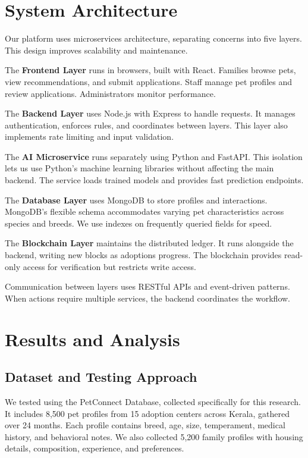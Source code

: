 \documentclass[conference]{IEEEtran}
\begin{document}
\section{System Architecture}

Our platform uses microservices architecture, separating concerns into five layers. This design improves scalability and maintenance.

The \textbf{Frontend Layer} runs in browsers, built with React. Families browse pets, view recommendations, and submit applications. Staff manage pet profiles and review applications. Administrators monitor performance.

The \textbf{Backend Layer} uses Node.js with Express to handle requests. It manages authentication, enforces rules, and coordinates between layers. This layer also implements rate limiting and input validation.

The \textbf{AI Microservice} runs separately using Python and FastAPI. This isolation lets us use Python's machine learning libraries without affecting the main backend. The service loads trained models and provides fast prediction endpoints.

The \textbf{Database Layer} uses MongoDB to store profiles and interactions. MongoDB's flexible schema accommodates varying pet characteristics across species and breeds. We use indexes on frequently queried fields for speed.

The \textbf{Blockchain Layer} maintains the distributed ledger. It runs alongside the backend, writing new blocks as adoptions progress. The blockchain provides read-only access for verification but restricts write access.

Communication between layers uses RESTful APIs and event-driven patterns. When actions require multiple services, the backend coordinates the workflow.

\section{Results and Analysis}

\subsection{Dataset and Testing Approach}

We tested using the PetConnect Database, collected specifically for this research. It includes 8,500 pet profiles from 15 adoption centers across Kerala, gathered over 24 months. Each profile contains breed, age, size, temperament, medical history, and behavioral notes. We also collected 5,200 family profiles with housing details, composition, experience, and preferences.
\end{document}
